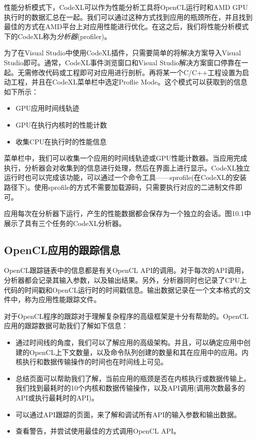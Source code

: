 性能分析模式下，CodeXL可以作为性能分析工具将OpenCL运行时和AMD GPU执行时的数据汇总在一起。我们可以通过这种方式找到应用的瓶颈所在，并且找到最佳的方式在AMD平台上对应用性能进行优化。在这之后，我们将性能分析模式下的CodeXL称为\emph{分析器}(profiler)。

为了在Visual Studio中使用CodeXL插件，只需要简单的将解决方案导入Visual Studio即可。通常，CodeXL事件浏览窗口和Visual Studio解决方案窗口停靠在一起。无需修改代码或工程即可对应用进行剖析。再将某一个C/C++工程设置为启动工程，并且在CodeXL菜单栏中选定Proflie Mode。这个模式可以获取到的信息如下所示：

\begin{itemize}
\item GPU应用时间线轨迹
\item GPU在执行内核时的性能计数
\item 收集CPU在执行时的性能信息
\end{itemize}

菜单栏中，我们可以收集一个应用的时间线轨迹或GPU性能计数器。当应用完成执行，分析器会对收集到的信息进行处理，然后在界面上进行显示。CodeXL独立运行时也可以完成该功能，可以通过一个命令工具——sprofile(在CodeXL的安装路径下)。使用sprofile的方式不需要加载源码，只需要执行对应的二进制文件即可。

应用每次在分析器下运行，产生的性能数据都会保存为一个独立的会话。图10.1中展示了具有三个任务的CodeXL分析器。


\subsection{OpenCL应用的跟踪信息}

OpenCL跟踪链表中的信息都是有关OpenCL API的调用。对于每次的API调用，分析器都会记录其输入参数，以及输出结果。另外，分析器同时也记录了CPU上代码的时间戳和OpenCL运行时的时间戳信息。输出数据记录在一个文本格式的文件中，称为应用性能跟踪文件。

对于OpenCL程序的跟踪对于理解复杂程序的高级框架是十分有帮助的。OpenCL应用的跟踪数据可助我们了解如下信息：

\begin{itemize}
\item 通过时间线的角度，我们可以了解应用的高级架构。并且，可以确定应用中创建的OpenCL上下文数量，以及命令队列创建的数量和其在应用中的应用。内核执行和数据传输操作的时间也在时间线上可见。
\item 总结页面可以帮助我们了解，当前应用的瓶颈是否在内核执行或数据传输上。我们找到最耗时的10个内核和数据传输操作，以及API调用(调用次数最多的API或执行最耗时的API)。
\item 可以通过API跟踪的页面，来了解和调试所有API的输入参数和输出数据。
\item 查看警告，并尝试使用最佳的方式调用OpenCL API。
\end{itemize}

